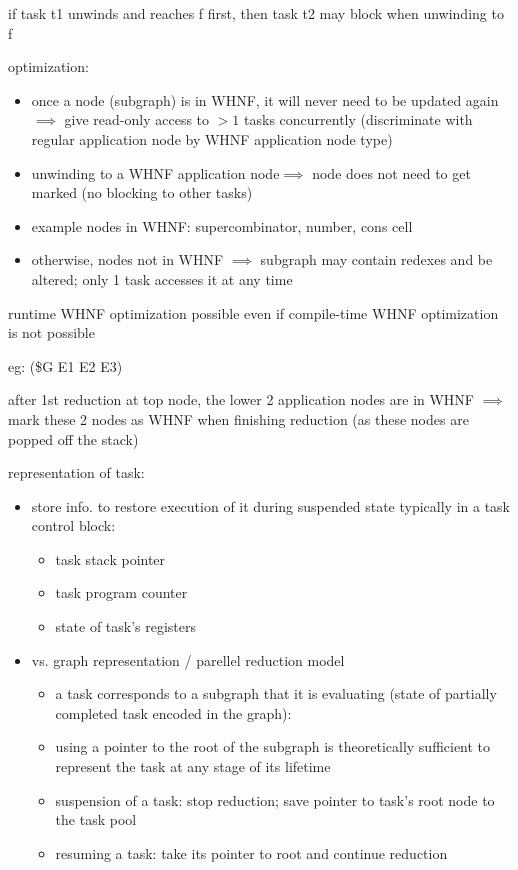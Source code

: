 \documentclass[8pt]{extarticle}
\begin{document}
\begin{multicols*}{2}
if task t1 unwinds and reaches f first, then task t2 may block when unwinding to f

optimization:
\begin{itemize}
\item once a node (subgraph) is in WHNF, it will never need to be updated again $\implies$ give read-only access to $>1$ tasks concurrently (discriminate with regular application node by WHNF application node type)
\item unwinding to a WHNF application node$\implies$ node does not need to get marked (no blocking to other tasks)
\item example nodes in WHNF: supercombinator, number, cons cell
\item otherwise, nodes not in WHNF $\implies$ subgraph may contain redexes and be altered; only 1 task accesses it at any time
\end{itemize}


runtime WHNF optimization possible even if compile-time WHNF optimization is not possible

eg: (\$G E1 E2 E3)

after 1st reduction at top node, the lower 2 application nodes are in WHNF $\implies$ mark these 2 nodes as WHNF when finishing reduction (as these nodes are popped off the stack)

representation of task:
\begin{itemize}
\item store info. to restore execution of it during suspended state
  typically in a task control block:
  \begin{itemize}
  \item task stack pointer
  \item task program counter
  \item state of task's registers
  \end{itemize}
\item vs. graph representation / parellel reduction model
  \begin{itemize}
  \item a task corresponds to a subgraph that it is evaluating (state of partially completed task encoded in the graph):
  \item using a pointer to the root of the subgraph is theoretically sufficient to represent the task at any stage of its lifetime
  \item suspension of a task: stop reduction; save pointer to task's root node to the task pool
  \item resuming a task: take its pointer to root and continue reduction
  \end{itemize}
\end{itemize}


\end{multicols*}
\end{document}
